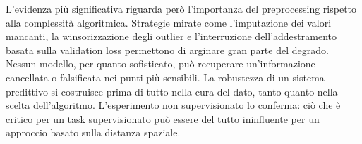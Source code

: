 \documentclass[12pt,a4paper]{article}
\begin{document}
L'evidenza più significativa riguarda però l'importanza del preprocessing
rispetto alla complessità algoritmica. Strategie mirate come l'imputazione dei
valori mancanti, la winsorizzazione degli outlier e l'interruzione
dell'addestramento basata sulla validation loss permettono di arginare gran
parte del degrado. Nessun modello, per quanto sofisticato, può recuperare
un'informazione cancellata o falsificata nei punti più sensibili. La robustezza
di un sistema predittivo si costruisce prima di tutto nella cura del dato, tanto
quanto nella scelta dell'algoritmo. L'esperimento non supervisionato lo
conferma: ciò che è critico per un task supervisionato può essere del tutto
ininfluente per un approccio basato sulla distanza spaziale.
\end{document}
